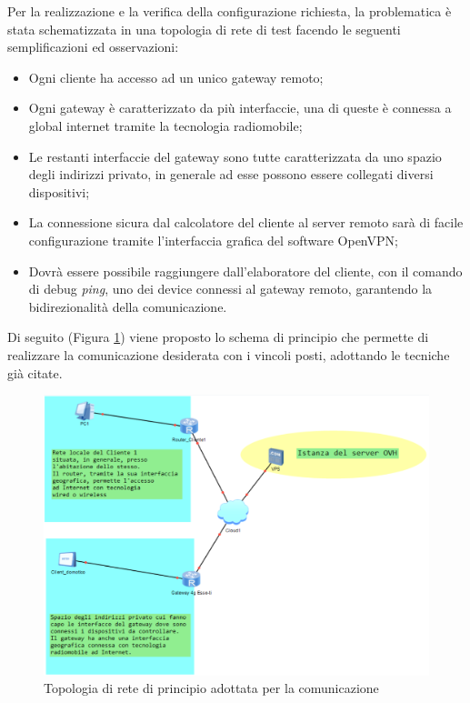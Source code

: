 Per la realizzazione e la verifica della configurazione richiesta, la problematica è stata schematizzata in una topologia di rete di test facendo le seguenti semplificazioni ed osservazioni:
\begin{itemize}
	\item Ogni cliente ha accesso ad un unico gateway remoto;
	\item Ogni gateway è caratterizzato da più interfaccie, una di queste è connessa a global internet tramite la tecnologia radiomobile;
	\item Le restanti interfaccie del gateway sono tutte caratterizzata da uno spazio degli indirizzi privato, in generale ad esse possono essere collegati diversi dispositivi;
	\item La connessione sicura dal calcolatore del cliente al server remoto sarà di facile configurazione tramite l'interfaccia grafica del software OpenVPN;
	\item Dovrà essere possibile raggiungere dall'elaboratore del cliente, con il comando di debug \textit{ping}, uno dei device connessi al gateway remoto, garantendo la bidirezionalità della comunicazione.
\end{itemize}
Di seguito (Figura \ref{fig:topologia_di_rete}) viene proposto lo schema di principio che permette di realizzare la comunicazione desiderata con i vincoli posti, adottando le tecniche già citate.
\vspace{5mm}
\begin{figure}[ht]
	\centering
	\includegraphics[width=1\textwidth]{immagini/topologia_di_rete_semplificata.png}
	\caption{Topologia di rete di principio adottata per la comunicazione}
	\label{fig:topologia_di_rete}
\end{figure}
